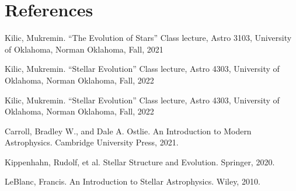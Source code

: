\documentclass[fleqn,usenatbib]{mnras}
\begin{document}
\section*{References}
\par Kilic, Mukremin. “The Evolution of Stars” Class lecture, Astro 3103,
University of Oklahoma, Norman Oklahoma, Fall, 2021
\par Kilic, Mukremin. “Stellar Evolution” Class lecture, Astro 4303,
University of Oklahoma, Norman Oklahoma, Fall, 2022
\par Kilic, Mukremin. “Stellar Evolution” Class lecture, Astro 4303,
University of Oklahoma, Norman Oklahoma, Fall, 2022
\par Carroll, Bradley W., and Dale A. Ostlie. An Introduction to Modern Astrophysics. Cambridge University Press, 2021. 
\par Kippenhahn, Rudolf, et al. Stellar Structure and Evolution. Springer, 2020. 
\par LeBlanc, Francis. An Introduction to Stellar Astrophysics. Wiley, 2010. 













\bsp	%
\label{lastpage}
\end{document}
